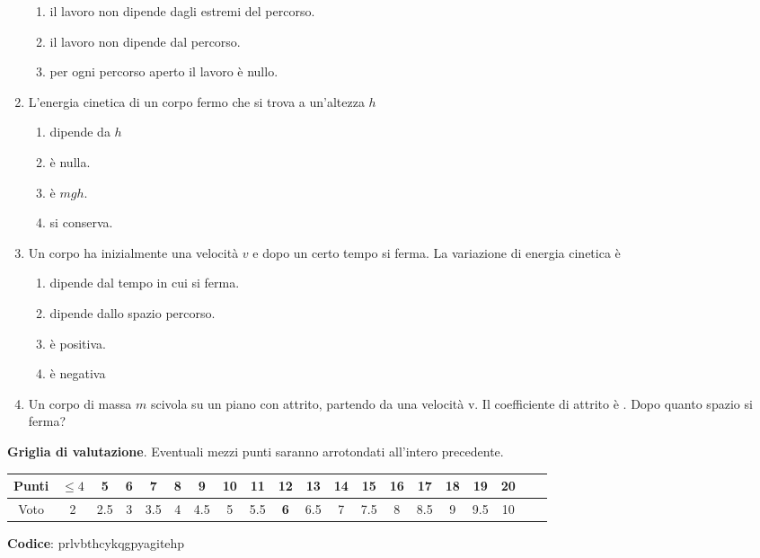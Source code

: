 \documentclass{article}
\begin{document}
\begin{enumerate}
\begin{enumerate}[label=\Alph*.]
    \item il lavoro non dipende dagli estremi del percorso.
    \item il lavoro non dipende dal percorso.
    \item per ogni percorso aperto il lavoro è nullo.
  \end{enumerate}
  \item L'energia cinetica di un corpo fermo che si trova a un'altezza $h$
  \begin{enumerate}[label=\Alph*.]
    \item dipende da $h$
    \item è nulla.
    \item è $mgh$.
    \item si conserva.
  \end{enumerate}
  \item Un corpo ha inizialmente una velocità $v$ e dopo un certo tempo si ferma. La variazione di energia cinetica è
  \begin{enumerate}[label=\Alph*.]
    \item dipende dal tempo in cui si ferma.
    \item dipende dallo spazio percorso.
    \item è positiva.
    \item è negativa
  \end{enumerate}
  \item Un corpo di massa $m$ scivola su un piano con attrito, partendo da una velocità v. Il coefficiente di attrito è \mu. Dopo quanto spazio si ferma?
  \begin{enumerate}[label=\Alph*.]
    \item $\frac{2v^2}{g\mu}}$.
    \item $\frac{v^2}{2g\mu}}$.
    \item $\frac{1}{2}v^2-\mu g$.
    \item $\frac{1}{2}v^2+\mu g$.
  \end{enumerate}
\end{enumerate}








\newpage \maketitle \centering \textbf{Griglia di valutazione}. Eventuali mezzi punti saranno arrotondati all'intero precedente. \begin{table}[h]     \centering \begin{tabular}{|c|c|c|c|c|c|c|c|c|c|c|c|c|c|c|c|c|c|c|c|} \hline Punti &  $\leq 4$ & 5 & 6 & 7 & 8 & 9 & 10 & 11 & \textbf{12} & 13 & 14 & 15 & 16 & 17 & 18 & 19 & 20 \\ \hline Voto & 2 & 2.5 & 3 & 3.5 & 4 & 4.5 & 5 & 5.5 & \textbf{6} & 6.5 & 7 & 7.5 & 8 & 8.5 & 9 & 9.5 & 10 \\ \hline \end{tabular} \end{table}
\textbf{Codice}: prlvbthcykqgpyagitehp
\end{document}
